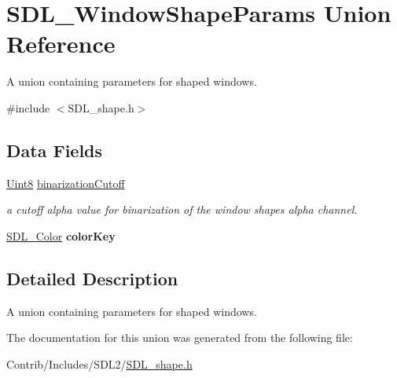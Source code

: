 \hypertarget{union_s_d_l___window_shape_params}{}\section{S\+D\+L\+\_\+\+Window\+Shape\+Params Union Reference}
\label{union_s_d_l___window_shape_params}


A union containing parameters for shaped windows.  




{\ttfamily \#include $<$S\+D\+L\+\_\+shape.\+h$>$}

\subsection*{Data Fields}
\begin{DoxyCompactItemize}
\item 
\hyperlink{_s_d_l__stdinc_8h_a2944638813a090aa23e62f4da842c3e2}{Uint8} \hyperlink{union_s_d_l___window_shape_params_a4cd674dc6ce063fa26ee9251ec4c962e}{binarization\+Cutoff}\hypertarget{union_s_d_l___window_shape_params_a4cd674dc6ce063fa26ee9251ec4c962e}{}\label{union_s_d_l___window_shape_params_a4cd674dc6ce063fa26ee9251ec4c962e}

\begin{DoxyCompactList}\small\item\em a cutoff alpha value for binarization of the window shape\textquotesingle{}s alpha channel. \end{DoxyCompactList}\item 
\hyperlink{struct_s_d_l___color}{S\+D\+L\+\_\+\+Color} {\bfseries color\+Key}\hypertarget{union_s_d_l___window_shape_params_a76bfee99df3e09547f00aed7ca18d4ad}{}\label{union_s_d_l___window_shape_params_a76bfee99df3e09547f00aed7ca18d4ad}

\end{DoxyCompactItemize}


\subsection{Detailed Description}
A union containing parameters for shaped windows. 

The documentation for this union was generated from the following file\+:\begin{DoxyCompactItemize}
\item 
Contrib/\+Includes/\+S\+D\+L2/\hyperlink{_s_d_l__shape_8h}{S\+D\+L\+\_\+shape.\+h}\end{DoxyCompactItemize}
